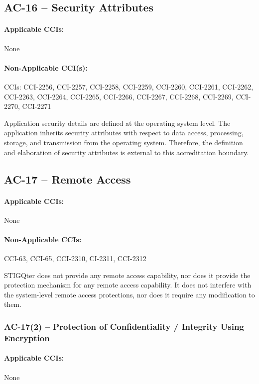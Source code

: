 \documentclass[letterpaper, 10pt, twoside]{article}
\begin{document}
\subsection{AC-16 -- Security Attributes}

\paragraph{Applicable CCIs:} None

\paragraph{Non-Applicable CCI(s):} CCIs: CCI-2256, CCI-2257, CCI-2258, CCI-2259, CCI-2260, CCI-2261, CCI-2262, CCI-2263, CCI-2264, CCI-2265, CCI-2266, CCI-2267, CCI-2268, CCI-2269, CCI-2270, CCI-2271

Application security details are defined at the operating system level. The application inherits security attributes with respect to data access, processing, storage, and transmission from the operating system. Therefore, the definition and elaboration of security attributes is external to this accreditation boundary.

\subsection{AC-17 -- Remote Access}

\paragraph{Applicable CCIs:} None

\paragraph{Non-Applicable CCIs:} CCI-63, CCI-65, CCI-2310, CI-2311, CCI-2312

STIGQter does not provide any remote access capability, nor does it provide the protection mechanism for any remote access capability. It does not interfere with the system-level remote access protections, nor does it require any modification to them.

\subsubsection{AC-17(2) -- Protection of Confidentiality / Integrity Using Encryption}

\paragraph{Applicable CCIs:} None
\end{document}
